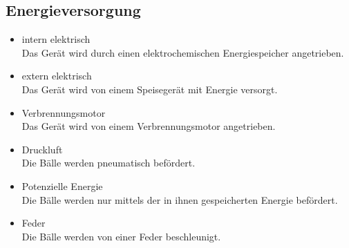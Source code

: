 \subsection{Energieversorgung}
\begin{itemize}
    \item intern elektrisch \\
        Das Gerät wird durch einen elektrochemischen Energiespeicher 
        angetrieben. 
    \item extern elektrisch \\
        Das Gerät wird von einem Speisegerät mit Energie versorgt. 
    \item Verbrennungsmotor \\
        Das Gerät wird von einem Verbrennungsmotor angetrieben. 
    \item Druckluft \\
        Die Bälle werden pneumatisch befördert. 
    \item Potenzielle Energie \\
        Die Bälle werden nur mittels der in ihnen gespeicherten Energie 
        befördert. 
    \item Feder \\
        Die Bälle werden von einer Feder beschleunigt. 
\end{itemize}


